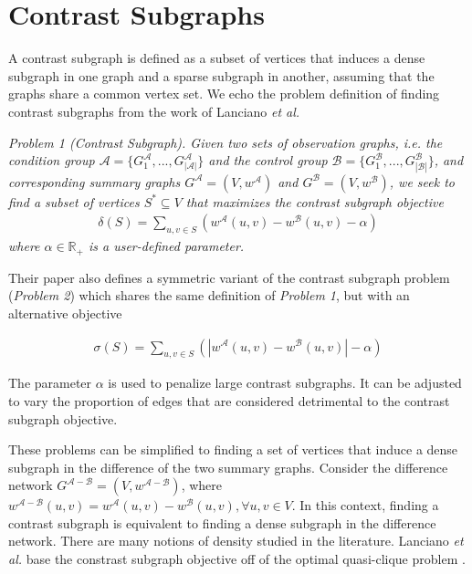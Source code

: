 \documentclass[letterpaper]{article}
\begin{document}
\section{Contrast Subgraphs} \label{cs}

A contrast subgraph is defined as a subset of vertices that induces a dense subgraph in one graph and a sparse subgraph in another, assuming that the graphs share a common vertex set.
We echo the problem definition of finding contrast subgraphs from the work of Lanciano \emph{et al.}

\emph{Problem 1 (Contrast Subgraph). Given two sets of observation graphs, i.e. the condition group $\mathcal{A} = \{G^{\mathcal{A}}_1, . . . , G^{\mathcal{A}}_{|\mathcal{A}|}\}$ and the control group $\mathcal{B} = \{G^{\mathcal{B}}_1, . . . , G^{\mathcal{B}}_{|\mathcal{B}|}\}$, and corresponding summary graphs $G^{\mathcal{A}} = (V, w^{\mathcal{A}})$ and $G^{\mathcal{B}} = (V, w^{\mathcal{B}})$, we seek to find a subset of vertices $S^* \subseteq V$ that maximizes the contrast subgraph objective}
\begin{align*}
    \delta (S) = \sum_{u,v \in S} \left(w^{\mathcal{A}}(u,v) - w^{\mathcal{B}}(u,v) - \alpha\right)
\end{align*}
\emph{where $\alpha \in \mathbb{R}_+$ is a user-defined parameter.}

Their paper also defines a symmetric variant of the contrast subgraph problem (\emph{Problem 2}) which shares the same definition of \emph{Problem 1}, but with an alternative objective

\begin{align*}
    \sigma (S) = \sum_{u,v \in S} \left(|w^{\mathcal{A}}(u,v) - w^{\mathcal{B}}(u,v)| - \alpha\right)
\end{align*}

The parameter $\alpha$ is used to penalize large contrast subgraphs.
It can be adjusted to vary the proportion of edges that are considered detrimental to the contrast subgraph objective.

These problems can be simplified to finding a set of vertices that induce a dense subgraph in the difference of the two summary graphs.
Consider the difference network  $G^{\mathcal{A} - \mathcal{B}} = (V, w^{\mathcal{A} - \mathcal{B}})$, where \\ $w^{\mathcal{A} - \mathcal{B}}(u,v) = w^{\mathcal{A}}(u,v) - w^{\mathcal{B}}(u,v), \forall u,v \in V$.
In this context, finding a contrast subgraph is equivalent to finding a dense subgraph in the difference network.
There are many notions of density studied in the literature.
Lanciano \emph{et al.} base the constrast subgraph objective off of the optimal quasi-clique problem \cite{tsourakakis2013}.
\end{document}
